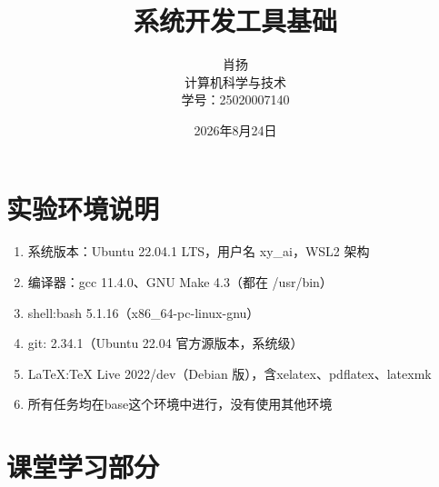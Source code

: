 \documentclass[a4paper,12pt]{report}
\begin{document}
\title{系统开发工具基础}
\author{肖扬\\计算机科学与技术\\
学号：25020007140}
\date{2026年8月24日}
\maketitle

\tableofcontents
\newpage
{}

\color{red}\chapter{实验环境说明}
\color{black}
\begin{enumerate}
    \item {\large 系统版本：Ubuntu 22.04.1 LTS，用户名 xy\_ai，WSL2 架构}
    \item {\large 编译器：gcc 11.4.0、GNU Make 4.3（都在 /usr/bin）}
    \item {\large shell:bash 5.1.16（x86\_64-pc-linux-gnu）}
    \item {\large git: 2.34.1（Ubuntu 22.04 官方源版本，系统级）}
    \item {\large LaTeX:TeX Live 2022/dev（Debian 版），含xelatex、pdflatex、latexmk}
    \item {\large 所有任务均在base这个环境中进行，没有使用其他环境}
\end{enumerate}

\color{red}\chapter{课堂学习部分}
\color{black}
\end{document}
